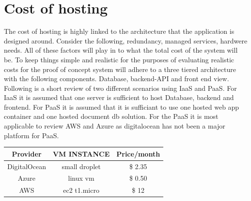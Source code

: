\documentclass[]{uiophd}
\begin{document}
\section{Cost of hosting}
The cost of hosting is highly linked to the architecture that the application is designed around. Consider the following, redundancy, managed services, hardwere needs. All of these factors will play in to what the total cost of the system will be. To keep things simple and realistic for the purposes of evaluating realistic costs for the proof of concept system will adhere to a three tiered architecture with the following components. Database, backend-API and front end view. Following is a short review of two different scenarios using IaaS and PaaS. For IaaS it is assumed that one server is sufficient to host Database, backend and frontend. For PaaS it is assumed that it is sufficiant to use one hosted web app container and one hosted document db solution. For the PaaS it is most applicable to review AWS and Azure as digitalocean has not been a major platform for PaaS.

\begin{center}
 \begin{tabular}{||c | c | c ||} 
 \hline
 Provider & VM INSTANCE & Price/month \\ [0.5ex] 
 \hline\hline
 DigitalOcean & small droplet & \$ 2.35 \\ 
 \hline
 Azure & linux vm &\$ 0.50 \\
 \hline
 AWS & ec2 t1.micro &\$ 12 \\
 \hline
\end{tabular}
\end{center}
\end{document}
